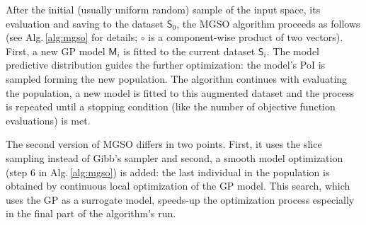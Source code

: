 \documentclass{itatnew}
\begin{document}
After the initial (usually uniform random) sample of the input space, its evaluation and saving to the dataset $\mathsf{S}_0$, the MGSO algorithm proceeds as follows (see Alg.\,\ref{alg:mgso} for details; $\circ$ is a component-wise product of two vectors). First, a new GP model $\mathsf{M}_i$ is fitted to the current dataset $\mathsf{S}_i$. The model predictive distribution guides the further optimization: the model's PoI is sampled forming the new population.
The algorithm continues with evaluating the population, a new model is fitted to this augmented dataset and the process is repeated until a stopping condition (like the number of objective function evaluations) is met.

The second version of MGSO differs in two points. First, it uses the slice sampling instead of Gibb's sampler and second, a smooth model optimization (step 6 in Alg.\,\ref{alg:mgso}) is added: the last individual in the population is obtained by continuous local optimization of the GP model. This search, which uses the GP as a surrogate model, speeds-up the optimization process especially in the final part of the algorithm's run. 
\end{document}
